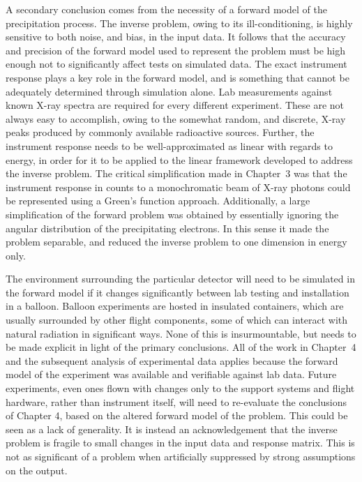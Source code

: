 A secondary conclusion comes from the necessity of a forward model of the precipitation process. The inverse problem, owing to its ill-conditioning, is highly sensitive to both noise, and bias, in the input data. It follows that the accuracy and precision of the forward model used to represent the problem must be high enough not to significantly affect tests on simulated data. The exact instrument response plays a key role in the forward model, and is something that cannot be adequately determined through simulation alone. Lab measurements against known X-ray spectra are required for every different experiment. These are not always easy to accomplish, owing to the somewhat random, and discrete, X-ray peaks produced by commonly available radioactive sources. Further, the instrument response needs to be well-approximated as linear with regards to energy, in order for it to be applied to the linear framework developed to address the inverse problem. The critical simplification made in Chapter~3 was that the instrument response in counts to a monochromatic beam of X-ray photons could be represented using a Green's function approach. Additionally, a large simplification of the forward problem was obtained by essentially ignoring the angular distribution of the precipitating electrons. In this sense it made the problem separable, and reduced the inverse problem to one dimension in energy only.

The environment surrounding the particular detector will need to be simulated in the forward model if it changes significantly between lab testing and installation in a balloon. Balloon experiments are hosted in insulated containers, which are usually surrounded by other flight components, some of which can interact with natural radiation in significant ways. None of this is insurmountable, but needs to be made explicit in light of the primary conclusions. All of the work in Chapter~4 and the subsequent analysis of experimental data applies because the forward model of the experiment was available and verifiable against lab data. Future experiments, even ones flown with changes only to the support systems and flight hardware, rather than instrument itself, will need to re-evaluate the conclusions of Chapter 4, based on the altered forward model of the problem. This could be seen as a lack of generality. It is instead an acknowledgement that the inverse problem is fragile to small changes in the input data and response matrix. This is not as significant of a problem when artificially suppressed by strong assumptions on the output. 

